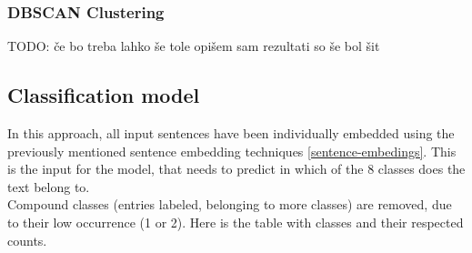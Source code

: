 \documentclass[fleqn,moreauthors,10pt]{ds_report}
\begin{document}
\begin{table}[h]
    \centering
    \caption{Cluster composition percentages using agglomerative clustering with embeddings from transformer all-mpnet-base-v2.}
    \label{tab:clusters_agglomerative}
    \end{table}


\subsubsection{DBSCAN Clustering}

TODO: če bo treba lahko še tole opišem sam rezultati so še bol šit


\subsection{Classification model}
In this approach, all input sentences have been individually embedded using the previously mentioned sentence embedding techniques \ref{sentence-embedings}. This is the input for the model, that needs to predict in which of the 8 classes does the text belong to. \\

Compound classes (entries labeled, belonging to more classes) are removed, due to their low occurrence (1 or 2). Here is the table with classes and their respected counts. \\
\end{document}
